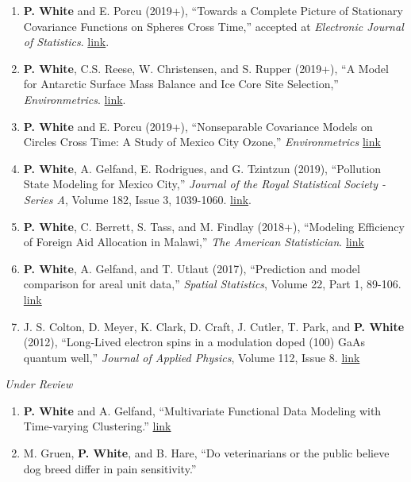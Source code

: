 \documentclass[11pt]{article}
\begin{document}
\begin{enumerate}[label=$\cdot$]
\item \textbf{P. White} and E. Porcu (2019+), ``Towards a Complete Picture of Stationary Covariance Functions on Spheres Cross Time,'' accepted at \emph{Electronic Journal of Statistics}. \href{https://arxiv.org/abs/1807.04272}{link}.
\item \textbf{P. White}, C.S. Reese, W. Christensen, and S. Rupper (2019+), ``A Model for Antarctic Surface Mass Balance and Ice Core Site Selection,'' \emph{Environmetrics}. \href{https://onlinelibrary.wiley.com/doi/abs/10.1002/env.2579}{link}.
\item \textbf{P. White} and E. Porcu (2019+), ``Nonseparable Covariance Models on Circles Cross Time: A Study of Mexico City Ozone,'' \emph{Environmetrics} \href{https://onlinelibrary.wiley.com/doi/full/10.1002/env.2558}{link}
\item \textbf{P. White}, A. Gelfand, E. Rodrigues, and G. Tzintzun (2019), ``Pollution State Modeling for Mexico City,'' \emph{Journal of the Royal Statistical Society - Series A}, Volume 182, Issue 3, 1039-1060. \href{https://rss.onlinelibrary.wiley.com/doi/abs/10.1111/rssa.12444}{link}.
\item \textbf{P. White}, C. Berrett, S. Tass, and M. Findlay (2018+), ``Modeling Efficiency of Foreign Aid Allocation in Malawi,'' \emph{The American Statistician}.  \href{https://www.tandfonline.com/doi/full/10.1080/00031305.2018.1470032}{link}
\item \textbf{P. White}, A. Gelfand, and T. Utlaut (2017), ``Prediction and model comparison for areal unit data,'' \emph{Spatial Statistics}, Volume 22, Part 1, 89-106. \href{http://www.sciencedirect.com/science/article/pii/S2211675317301422}{link}
\item J. S. Colton, D. Meyer, K. Clark, D. Craft, J. Cutler, T. Park, and \textbf{P. White} (2012), ``Long-Lived electron spins in a modulation doped (100) GaAs quantum well,'' \emph{Journal of Applied Physics}, Volume 112, Issue 8.  \href{http://aip.scitation.org/doi/abs/10.1063/1.4759320}{link}
\end{enumerate}

\emph{Under Review}

\begin{enumerate}[label=$\cdot$]
\item \textbf{P. White} and A. Gelfand, ``Multivariate Functional Data Modeling with Time-varying Clustering.'' \href{https://arxiv.org/abs/1904.11518}{link}
\item M. Gruen, \textbf{P. White}, and B. Hare, ``Do veterinarians or the public believe dog breed differ in pain sensitivity.''
\end{enumerate}
\end{document}
